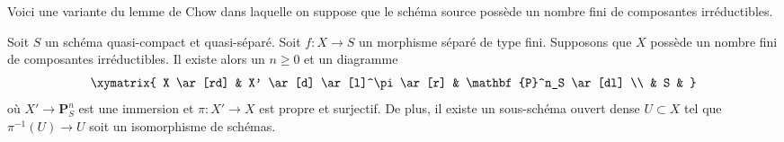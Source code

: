 \noindent
Voici une variante du lemme de Chow dans laquelle on suppose que le schéma
source possède un nombre fini de composantes irréductibles.

\begin{lemma}
\label{lemma-chow-EGA}
Soit $S$ un schéma quasi-compact et quasi-séparé.
Soit $f : X \to S$ un morphisme séparé de type fini.
Supposons que $X$ possède un nombre fini de composantes irréductibles.
Il existe alors un $n \geq 0$ et un diagramme
$$
\xymatrix{
X \ar[rd] & X' \ar[d] \ar[l]^\pi \ar[r] & \mathbf{P}^n_S \ar[dl] \\
& S &
}
$$
où $X' \to \mathbf{P}^n_S$ est une immersion et
$\pi : X' \to X$ est propre et surjectif. De plus, il existe
un sous-schéma ouvert dense $U \subset X$ tel que $\pi^{-1}(U) \to U$
soit un isomorphisme de schémas.
\end{lemma}

